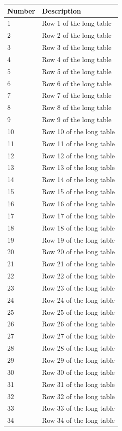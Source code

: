 \documentclass{article}
\begin{document}
\begin{longtable}{ll}
Number & Description \\
\hline
\endhead
1 & Row 1 of the long table \\
2 & Row 2 of the long table \\
3 & Row 3 of the long table \\
4 & Row 4 of the long table \\
5 & Row 5 of the long table \\
6 & Row 6 of the long table \\
7 & Row 7 of the long table \\
8 & Row 8 of the long table \\
9 & Row 9 of the long table \\
10 & Row 10 of the long table \\
11 & Row 11 of the long table \\
12 & Row 12 of the long table \\
13 & Row 13 of the long table \\
14 & Row 14 of the long table \\
15 & Row 15 of the long table \\
16 & Row 16 of the long table \\
17 & Row 17 of the long table \\
18 & Row 18 of the long table \\
19 & Row 19 of the long table \\
20 & Row 20 of the long table \\
21 & Row 21 of the long table \\
22 & Row 22 of the long table \\
23 & Row 23 of the long table \\
24 & Row 24 of the long table \\
25 & Row 25 of the long table \\
26 & Row 26 of the long table \\
27 & Row 27 of the long table \\
28 & Row 28 of the long table \\
29 & Row 29 of the long table \\
30 & Row 30 of the long table \\
31 & Row 31 of the long table \\
32 & Row 32 of the long table \\
33 & Row 33 of the long table \\
34 & Row 34 of the long table \\

\end{longtable}
\end{document}
